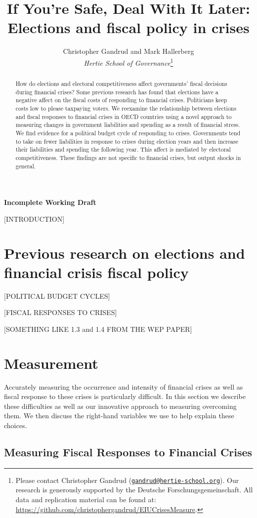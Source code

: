 \documentclass[]{article}
\title{If You're Safe, Deal With It Later: Elections and fiscal policy in crises}
\author{Christopher Gandrud and Mark Hallerberg \\ \emph{Hertie School of Governance}\footnote{Please contact Christopher Gandrud
(\href{mailto:gandrud@hertie-school.org}{\nolinkurl{gandrud@hertie-school.org}}).
Our research is generously supported by the Deutsche Forschungsgemeinschaft.
All data and replication material can be found at:
\url{https://github.com/christophergandrud/EIUCrisesMeasure}.}}
\begin{document}
\maketitle


\textbf{Incomplete Working Draft}

\begin{abstract}
How do elections and electoral competitiveness affect governments' fiscal decisions during financial crises? Some previous research has found that elections have a negative affect on the fiscal costs of responding to financial crises. Politicians keep costs low to please taxpaying voters. We reexamine the relationship between elections and fiscal responses to financial crises in OECD countries using a novel approach to measuring changes in government liabilities and spending as a result of financial stress. We find evidence for a political budget cycle of responding to crises. Governments tend to take on fewer liabilities in response to crises during election years and then increase their liabilities and spending the following year. This affect is mediated by electoral competitiveness. These findings are not specific to financial crises, but output shocks in general.

\end{abstract}

[INTRODUCTION]

\section{Previous research on elections and financial crisis fiscal policy}

[POLITICAL BUDGET CYCLES]

[FISCAL RESPONSES TO CRISES]

[SOMETHING LIKE 1.3 and 1.4 FROM THE WEP PAPER]

\section{Measurement}

Accurately measuring the occurrence and intensity of financial crises as well as fiscal response to these crises is particularly difficult. In this section we describe these difficulties as well as our innovative approach to measuring overcoming them. We then discuss the right-hand variables we use to help explain these choices.

\subsection*{Measuring Fiscal Responses to Financial Crises}
\end{document}

